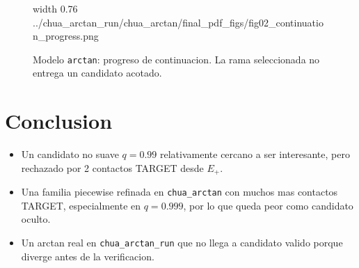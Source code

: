 \documentclass[11pt]{article}
\newcommand{\img}[2]{%
  \begingroup
  \pdfximage width #1 {#2}%
  \pdfrefximage\pdflastximage
  \endgroup
}
\newcommand{\pathcell}[1]{\texttt{\footnotesize #1}}
\begin{document}
\begin{figure}[H]
\centering
\img{0.76\textwidth}{../chua_arctan_run/chua_arctan/final_pdf_figs/fig02_continuation_progress.png}
\caption{Modelo \pathcell{arctan}: progreso de continuacion. La rama seleccionada no entrega un candidato acotado.}
\end{figure}


\section*{Conclusion}


\begin{itemize}
  \item Un candidato no suave \(q=0.99\) relativamente cercano a ser interesante,
  pero rechazado por 2 contactos TARGET desde \(E_+\).
  \item Una familia piecewise refinada en \pathcell{chua\_arctan} con muchos mas
  contactos TARGET, especialmente en \(q=0.999\), por lo que queda peor como
  candidato oculto.
  \item Un arctan real en \pathcell{chua\_arctan\_run} que no llega a candidato
  valido porque diverge antes de la verificacion.
\end{itemize}
\end{document}
